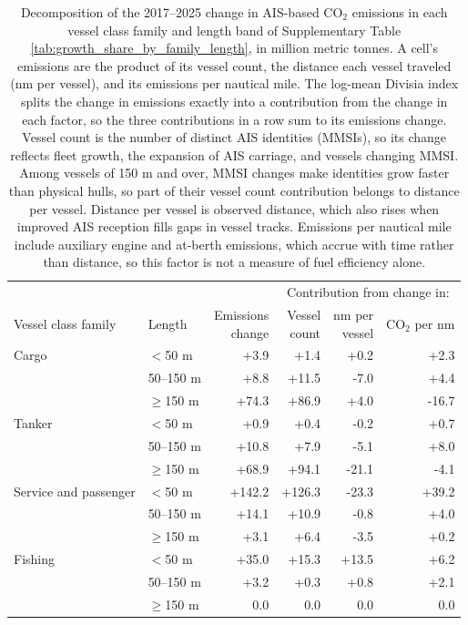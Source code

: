 \begin{table}[!h]
\centering
\caption{\label{tab:growth_decomposition_by_family_length}Decomposition of the 2017--2025 change in AIS-based CO$_{2}$ emissions in each vessel class family and length band of Supplementary Table \ref{tab:growth_share_by_family_length}, in million metric tonnes. A cell's emissions are the product of its vessel count, the distance each vessel traveled (nm per vessel), and its emissions per nautical mile. The log-mean Divisia index \cite{angLMDIApproachDecomposition2005} splits the change in emissions exactly into a contribution from the change in each factor, so the three contributions in a row sum to its emissions change. Vessel count is the number of distinct AIS identities (MMSIs), so its change reflects fleet growth, the expansion of AIS carriage, and vessels changing MMSI. Among vessels of 150 m and over, MMSI changes make identities grow faster than physical hulls, so part of their vessel count contribution belongs to distance per vessel. Distance per vessel is observed distance, which also rises when improved AIS reception fills gaps in vessel tracks. Emissions per nautical mile include auxiliary engine and at-berth emissions, which accrue with time rather than distance, so this factor is not a measure of fuel efficiency alone.}
\centering
\fontsize{7}{9}\selectfont
\setlength{\tabcolsep}{3pt}
\begin{tabular}[t]{llrrrr}
\toprule
\multicolumn{3}{c}{ } & \multicolumn{3}{c}{Contribution from change in:} \\
\cmidrule(l{3pt}r{3pt}){4-6}
Vessel class family & Length & \shortstack{Emissions\\change} & \shortstack{Vessel\\count} & \shortstack{nm per\\vessel} & \shortstack{CO$_{2}$\\per nm}\\
\midrule
Cargo & $<$50 m & +3.9 & +1.4 & +0.2 & +2.3\\
 & 50--150 m & +8.8 & +11.5 & -7.0 & +4.4\\
 & $\geq$150 m & +74.3 & +86.9 & +4.0 & -16.7\\
\addlinespace
Tanker & $<$50 m & +0.9 & +0.4 & -0.2 & +0.7\\
 & 50--150 m & +10.8 & +7.9 & -5.1 & +8.0\\
 & $\geq$150 m & +68.9 & +94.1 & -21.1 & -4.1\\
\addlinespace
Service and passenger & $<$50 m & +142.2 & +126.3 & -23.3 & +39.2\\
 & 50--150 m & +14.1 & +10.9 & -0.8 & +4.0\\
 & $\geq$150 m & +3.1 & +6.4 & -3.5 & +0.2\\
\addlinespace
Fishing & $<$50 m & +35.0 & +15.3 & +13.5 & +6.2\\
 & 50--150 m & +3.2 & +0.3 & +0.8 & +2.1\\
 & $\geq$150 m & 0.0 & 0.0 & 0.0 & 0.0\\
\bottomrule
\end{tabular}
\end{table}
